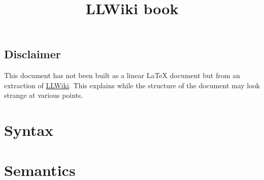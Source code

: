 \documentclass[a4paper,11pt,oneside]{book}
\title{LLWiki book}
\begin{document}
\maketitle

\chapter*{Disclaimer}

This document has not been built as a linear \LaTeX{} document but from an extraction of \href{http://llwiki.ens-lyon.fr/}{LLWiki}.
This explains while the structure of the document may look strange at various points.


\tableofcontents

\part{Syntax}


































\part{Semantics}





















\appendix





\end{document}
